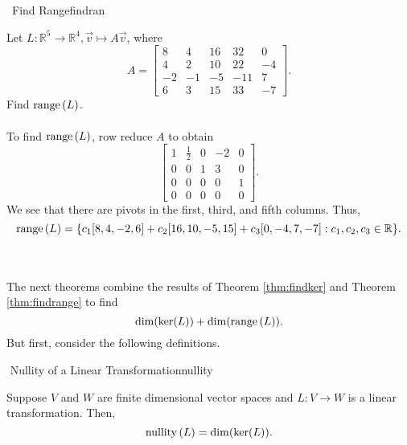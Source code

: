         \pagebreak
        \begin{example}{\Difficulty\,\Difficulty\,\,Find Range}{findran}

            Let \(L:\mathbb{R}^5\to\mathbb{R}^4,\vec{v}\mapsto A\vec{v}\), where
            \begin{equation*}
                A=\begin{bmatrix}
                    8 & 4 & 16 & 32 & 0 \\
                    4 & 2 & 10 & 22 & -4 \\
                    -2 & -1 & -5 & -11 & 7 \\
                    6 & 3 & 15 & 33 & -7
                \end{bmatrix}.
            \end{equation*}
            Find \(\text{range\,}(L)\).
            \\
            \\
            To find \(\text{range\,}(L)\), row reduce \(A\) to obtain
            \begin{equation*}
                \begin{bmatrix}
                    1 & \frac{1}{2} & 0 & -2 & 0 \\
                    0 & 0 & 1 & 3 & 0 \\
                    0 & 0 & 0 & 0 & 1 \\
                    0 & 0 & 0 & 0 & 0 
                \end{bmatrix}.
            \end{equation*}
            We see that there are pivots in the first, third, and fifth columns. Thus, 
            \begin{equation*}
                \text{range\,}(L)=\{c_1[8,4,-2,6]+c_2[16,10,-5,15]+c_3[0,-4,7,-7]:c_1,c_2,c_3\in\mathbb{R}\}.
            \end{equation*}
            
        \end{example}
        \pagebreak
        \vphantom
        \\
        \\
        The next theorems combine the results of Theorem \ref{thm:findker} and Theorem \ref{thm:findrange} to find 
        \begin{equation*}
            \dim(\ker(L))+\dim(\text{range\,}(L)).
        \end{equation*}
        But first, consider the following definitions.
        \begin{definition}{\Stop\,\,Nullity of a Linear Transformation}{nullity}

            Suppose \(V\) and \(W\) are finite dimensional vector spaces and \(L:V\to W\) is a linear transformation. Then,
            \begin{equation*}
                \text{nullity\,}(L)=\dim(\ker(L)).
            \end{equation*}
            
        \end{definition}
